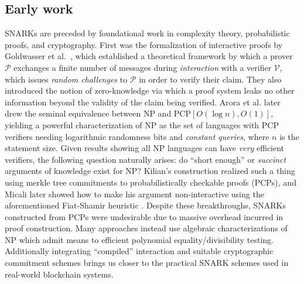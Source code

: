 \subsection{Early work}
\noindent SNARKs are preceded by foundational work in complexity theory, probabilistic proofs, and cryptography. First was the formalization of interactive proofs by Goldwasser et al.\ \cite{ipfirst}, which established a theoretical framework by which a prover $\mathcal{P}$ exchanges a finite number of messages during \textit{interaction} with a verifier $\mathcal{V}$, which issues \textit{random challenges} to $\mathcal{P}$ in order to verify their claim. They also introduced the notion of zero-knowledge via which a proof system leaks no other information beyond the validity of the claim being verified. Arora et al. \cite{pcpthm1, pcpthm2} later drew the seminal equivalence between NP and PCP$[O(\log n), O(1)]$, yielding a powerful characterization of NP as the set of languages with PCP verifiers needing logarithmic randomness bits and \textit{constant queries}, where $n$ is the statement size. Given results showing all NP languages can have \textit{very} efficient verifiers, the following question naturally arises: do ``short enough'' or \textit{succinct} arguments of knowledge exist for NP? Kilian's construction \cite{kilian} realized such a thing using merkle tree commitments to probabilistically checkable proofs (PCPs), and Micali later showed how to make his argument non-interactive \cite{micalisnark} using the aforementioned Fiat-Shamir heuristic \cite{fiatshamir}. Despite these breakthroughs, SNARKs constructed from PCPs were undesirable due to massive overhead incurred in proof construction. Many approaches instead use algebraic characterizations of NP which admit means to efficient polynomial equality/divisibility testing. Additionally integrating ``compiled'' interaction and suitable cryptographic commitment schemes brings us closer to the practical SNARK schemes used in real-world blockchain systems.\\

